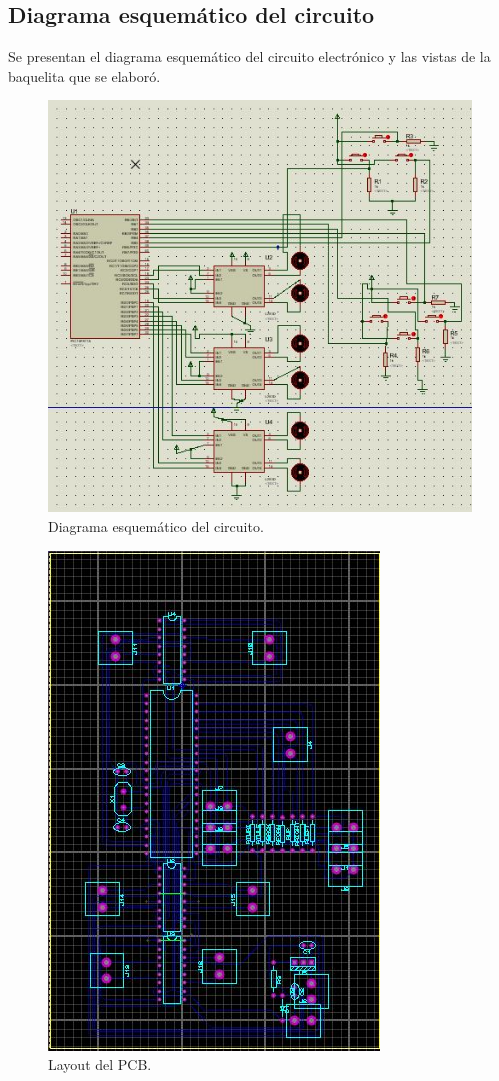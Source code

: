  \pagebreak
\subsection{Diagrama esquem\'atico del circuito}
Se presentan el diagrama esquem\'atico del circuito electr\'onico y las vistas de la baquelita que se elabor\'o.

 \begin{figure}[!htbp]
 \centering
 \includegraphics [scale=0.5]
 {./img/seaperch_schematic.png}
 \caption{Diagrama esquem\'atico del circuito.}
 \end{figure}

  \begin{figure}[!htbp]
 \centering
 \includegraphics [scale=0.5]
 {./img/seaperch_pcb.png}
 \caption{Layout del PCB.}
 \end{figure}

